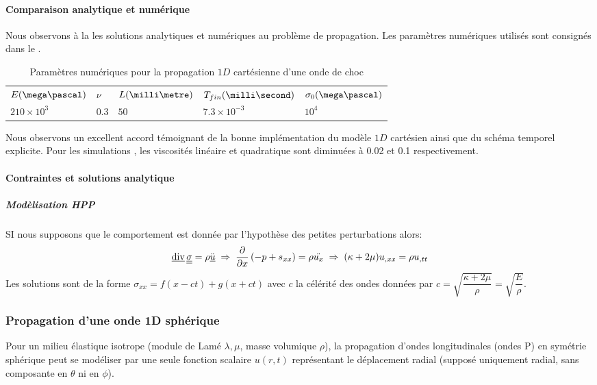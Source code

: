 \documentclass[10pt]{book}
\begin{document}
\paragraph{Comparaison analytique et numérique}
Nous observons à la  les solutions analytiques et numériques au problème de propagation. Les paramètres numériques utilisés sont consignés dans le .
\begin{table}
\centering \begin{tabular}{lllll}\hline
$E(\mega\pascal)$  & $\nu$ & $L(\milli\metre)$ & $T_{fin}(\milli\second)$ & $\sigma_{0} (\mega\pascal)$\\
$210\times10^{3}$ & 0.3 & $50$ & $7.3\times 10^{-3}$ & $10^{4}$\\\hline
\end{tabular}
\caption{Paramètres numériques pour la propagation $1D$ cartésienne d'une onde de choc}
\label{Table:Parametres_nu_1D_carte}
\end{table}
Nous observons un excellent accord témoignant de la bonne implémentation du modèle $1D$ cartésien ainsi que du schéma temporel explicite. Pour les simulations , les viscosités linéaire et quadratique sont diminuées à 0.02 et 0.1 respectivement.
\paragraph{Contraintes et solutions analytique}
\subparagraph{Modèlisation HPP} SI nous supposons que le comportement est donnée par l'hypothèse des petites perturbations alors:
$$\vdiv\SC = \rho\ddot{\Dep}\implique \dfrac{\partial}{\partial x}\left(-p+s_{xx}\right)=\rho\ddot{u_{x}}\implique (\kappa+2\mu)u_{,xx}=\rho u_{,tt}$$
Les solutions sont de la forme $\sigma_{xx} = f(x-ct)+g(x+ct)$ avec $c$ la célérité des ondes données par $c = \sqrt{\dfrac{\kappa+2\mu}{\rho}}=\sqrt{\dfrac{E}{\rho}}$.
\subsubsection{Propagation d'une onde 1D sphérique}
Pour un milieu élastique isotrope (module de Lamé $\lambda,\mu$, masse volumique $\rho$), la propagation d’ondes longitudinales (ondes P) en symétrie sphérique peut se modéliser par une seule fonction scalaire $u(r,t)$ représentant le déplacement radial (supposé uniquement radial, sans composante en $\theta$ ni en $\phi$).  
\end{document}
